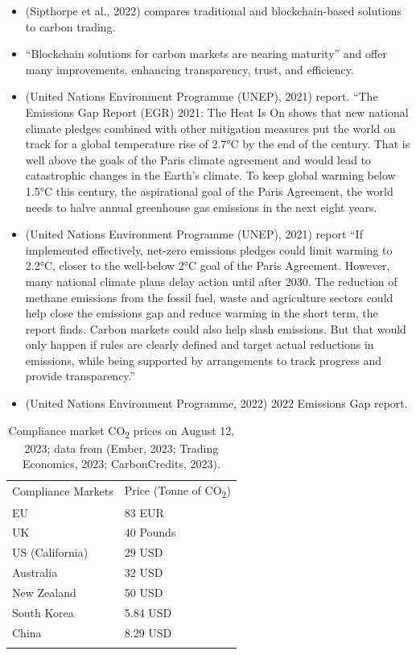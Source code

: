 \documentclass[
  letterpaper,
  DIV=11,
  numbers=noendperiod]{scrartcl}
\begin{document}
\begin{itemize}
\item
  (Sipthorpe et al., 2022) compares traditional and blockchain-based
  solutions to carbon trading.
\item
  ``Blockchain solutions for carbon markets are nearing maturity'' and
  offer many improvements. enhancing transparency, trust, and
  efficiency.
\item
  (United Nations Environment Programme (UNEP), 2021) report. ``The
  Emissions Gap Report (EGR) 2021: The Heat Is On shows that new
  national climate pledges combined with other mitigation measures put
  the world on track for a global temperature rise of 2.7°C by the end
  of the century. That is well above the goals of the Paris climate
  agreement and would lead to catastrophic changes in the Earth's
  climate. To keep global warming below 1.5°C this century, the
  aspirational goal of the Paris Agreement, the world needs to halve
  annual greenhouse gas emissions in the next eight years.
\item
  (United Nations Environment Programme (UNEP), 2021) report ``If
  implemented effectively, net-zero emissions pledges could limit
  warming to 2.2°C, closer to the well-below 2°C goal of the Paris
  Agreement. However, many national climate plans delay action until
  after 2030. The reduction of methane emissions from the fossil fuel,
  waste and agriculture sectors could help close the emissions gap and
  reduce warming in the short term, the report finds. Carbon markets
  could also help slash emissions. But that would only happen if rules
  are clearly defined and target actual reductions in emissions, while
  being supported by arrangements to track progress and provide
  transparency.''
\item
  (United Nations Environment Programme, 2022) 2022 Emissions Gap
  report.
\end{itemize}

\begin{longtable}[]{@{}ll@{}}
\caption{Compliance market CO\textsubscript{2} prices on August 12,
2023; data from (Ember, 2023; Trading Economics, 2023; CarbonCredits,
2023).}\tabularnewline
\toprule\noalign{}
\endfirsthead
\endhead
\bottomrule\noalign{}
\endlastfoot
Compliance Markets & Price (Tonne of CO\textsubscript{2}) \\
EU & 83 EUR \\
UK & 40 Pounds \\
US (California) & 29 USD \\
Australia & 32 USD \\
New Zealand & 50 USD \\
South Korea & 5.84 USD \\
China & 8.29 USD \\
& \\
\end{longtable}
\end{document}
